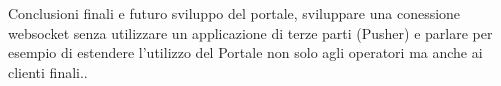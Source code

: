 Conclusioni finali e futuro sviluppo del portale, sviluppare  una conessione websocket senza utilizzare un applicazione di terze parti (Pusher) e parlare per esempio di estendere l'utilizzo del Portale non solo agli operatori ma anche ai clienti finali..
